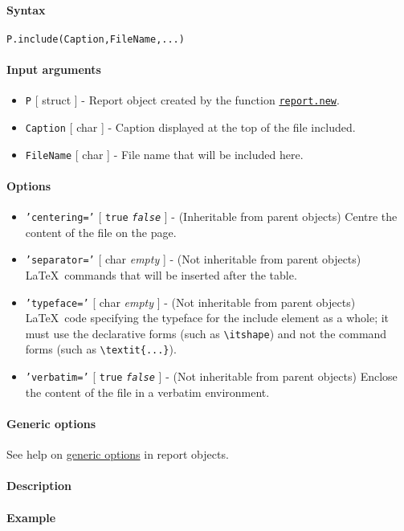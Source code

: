 


	\paragraph{Syntax}\label{syntax}

\begin{verbatim}
P.include(Caption,FileName,...)
\end{verbatim}

\paragraph{Input arguments}\label{input-arguments}

\begin{itemize}
\item
  \texttt{P} {[} struct {]} - Report object created by the function
  \href{report/new}{\texttt{report.new}}.
\item
  \texttt{Caption} {[} char {]} - Caption displayed at the top of the
  file included.
\item
  \texttt{FileName} {[} char {]} - File name that will be included here.
\end{itemize}

\paragraph{Options}\label{options}

\begin{itemize}
\item
  \texttt{'centering='} {[} \texttt{true} \textbar{}
  \emph{\texttt{false}} {]} - (Inheritable from parent objects) Centre
  the content of the file on the page.
\item
  \texttt{'separator='} {[} char \textbar{} \emph{empty} {]} - (Not
  inheritable from parent objects) \LaTeX~commands that will be inserted
  after the table.
\item
  \texttt{'typeface='} {[} char \textbar{} \emph{empty} {]} - (Not
  inheritable from parent objects) \LaTeX~code specifying the typeface
  for the include element as a whole; it must use the declarative forms
  (such as \texttt{\textbackslash{}itshape}) and not the command forms
  (such as \texttt{\textbackslash{}textit\{...\}}).
\item
  \texttt{'verbatim='} {[} \texttt{true} \textbar{}
  \emph{\texttt{false}} {]} - (Not inheritable from parent objects)
  Enclose the content of the file in a verbatim environment.
\end{itemize}

\paragraph{Generic options}\label{generic-options}

See help on \href{report/Contents}{generic options} in report objects.

\paragraph{Description}\label{description}

\paragraph{Example}\label{example}


